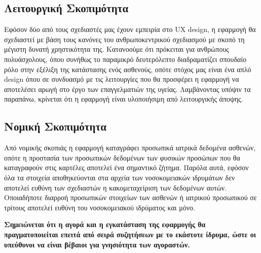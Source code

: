 \documentclass{article}
\begin{document}
\subsection{Λειτουργική Σκοπιμότητα}

Εφόσον δύο από τους σχεδιαστές μας έχουν εμπειρία στο UX design, η εφαρμογή θα σχεδιαστεί με βάση τους κανόνες του ανθρωποκεντρικού σχεδιασμού με σκοπό τη μέγιστη δυνατή χρηστικότητα της. Κατανοούμε ότι πρόκειται για ανθρώπους πολυάσχολους, όπου συνήθως το παραμικρό δευτερόλεπτο διαδραματίζει σπουδαίο ρόλο στην εξέλιξη της κατάστασης ενός ασθενούς, οπότε στόχος μας είναι ένα απλό design όπου σε συνδυασμό με τις λειτουργίες που θα προσφέρει η εφαρμογή να αποτελέσει αρωγή στο έργο των επαγγελματιών της υγείας. Λαμβάνοντας υπόψιν τα παραπάνω, κρίνεται ότι η εφαρμογή είναι υλοποιήσιμη από λειτουργικής άποψης.

\subsection{Νομική Σκοπιμότητα}

Από νομικής σκοπιάς η εφαρμογή καταγράφει προσωπικά ιατρικά δεδομένα ασθενών, οπότε η προστασία των προσωπικών δεδομένων των φυσικών προσώπων που θα καταγραφούν στις καρτέλες αποτελεί ένα σημαντικό ζήτημα. Παρόλα αυτά, εφόσον όλα τα στοιχεία αποθηκεύονται στα αρχεία των νοσοκομειακών ιδρυμάτων δεν αποτελεί ευθύνη των σχεδιαστών η κακομεταχείριση των δεδομένων αυτών. Οποιαδήποτε διαρροή προσωπικών στοιχείων των ασθενών ή ιατρικού προσωπικού σε τρίτους αποτελεί ευθύνη του νοσοκομειακού ιδρύματος και μόνο. \newline \par
\textbf{Σημειώνεται ότι η αγορά και η εγκατάσταση της εφαρμογής θα πραγματοποιείται επειτά από σειρά συζητήσεων με το εκάστοτε ίδρυμα, ώστε οι υπεύθυνοι να είναι βέβαιοι για γνησιότητα των αγοραστών.}
\end{document}
